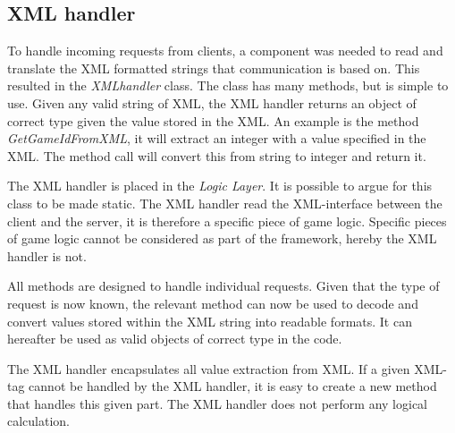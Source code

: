 \subsection{XML handler}
\label{sec:xmlhandlerimpl}
To handle incoming requests from clients, a component was needed to read and translate the XML formatted strings that communication is based on. This resulted in the \textit{XMLhandler} class. The class has many methods, but is simple to use. Given any valid string of XML, the XML handler returns an object of correct type given the value stored in the XML. An example is the method \textit{GetGameIdFromXML}, it will extract an integer with a value specified in the XML. The method call will convert this from string to integer and return it. 

The XML handler is placed in the \textit{Logic Layer}. It is possible to argue for this class to be made static. The XML handler read the XML-interface between the client and the server, it is therefore a specific piece of game logic.  Specific pieces of game logic cannot be considered as part of the framework, hereby the XML handler is not.

All methods are designed to handle individual requests. Given that the type of request is now known, the relevant method can now be used to decode and convert values stored within the XML string into readable formats. It can hereafter be used as valid objects of correct type in the code.

The XML handler encapsulates all value extraction from XML. If a given XML-tag cannot be handled by the XML handler, it is easy to create a new method that handles this given part. The XML handler does not perform any logical calculation.